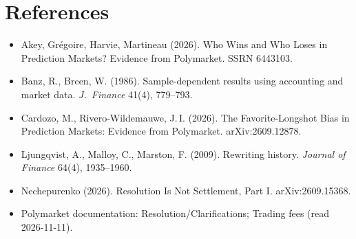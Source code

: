 \documentclass[10pt]{article}
\begin{document}
\footnotesize
\vspace{-0.8em}
\section*{References}
\begin{itemize}[leftmargin=*,label={},nosep]
  \item Akey, Gr\'egoire, Harvie, Martineau (2026). Who Wins and Who Loses in
        Prediction Markets? Evidence from Polymarket. SSRN 6443103.
  \item Banz, R., Breen, W. (1986). Sample-dependent results using accounting
        and market data. \emph{J.\ Finance} 41(4), 779--793.
  \item Cardozo, M., Rivero-Wildemauwe, J.\,I. (2026). The Favorite-Longshot
        Bias in Prediction Markets: Evidence from Polymarket.
        arXiv:2609.12878.
  \item Ljungqvist, A., Malloy, C., Marston, F. (2009). Rewriting history.
        \emph{Journal of Finance} 64(4), 1935--1960.
  \item Nechepurenko (2026). Resolution Is Not Settlement, Part I.
        arXiv:2609.15368.
  \item Polymarket documentation: Resolution/Clarifications; Trading fees
        (read 2026-11-11).
\end{itemize}
\end{document}
